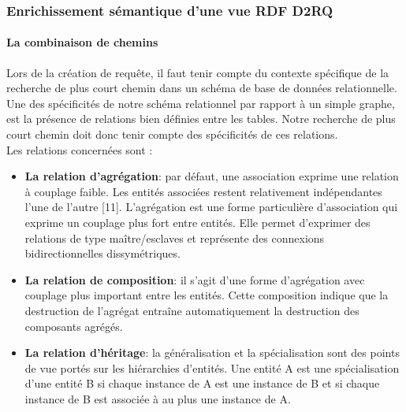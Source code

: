 \subsubsection*{Enrichissement sémantique d'une vue RDF D2RQ}
\paragraph*{La combinaison de chemins}
Lors de la création de requête, il faut tenir compte du contexte spécifique de la recherche de plus court chemin dans un schéma de base de données relationnelle. Une des spécificités de notre schéma relationnel par rapport à un simple graphe, est la présence de relations bien définies entre les tables. Notre recherche de plus court chemin doit donc tenir compte des spécificités de ces relations.\\

Les relations concernées sont :\\
\begin{itemize}
\item \textbf{La relation d'agrégation}: par défaut, une association exprime une relation à couplage faible. Les entités associées restent relativement indépendantes l'une de l'autre [11]. L'agrégation est une forme particulière d'association qui exprime un couplage plus fort entre entités. Elle permet d'exprimer des relations de type maître/esclaves et représente des connexions bidirectionnelles dissymétriques. \\
\item \textbf{La relation de composition}: il s'agit d'une forme d'agrégation avec couplage plus important entre les entités. Cette composition indique que la destruction de l'agrégat entraîne automatiquement la destruction des composants agrégés.\\
\item \textbf{La relation d'héritage}: la généralisation et la spécialisation sont des points de vue portés sur les hiérarchies d'entités. Une entité A est une spécialisation d'une entité B si chaque instance de A est une instance de B et si chaque instance de B est associée à au plus une instance de A.\\

\end{itemize}

